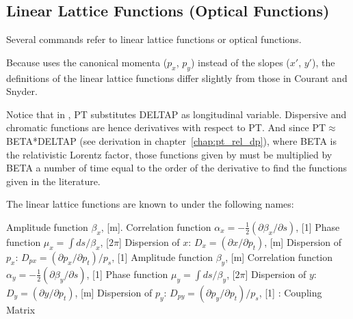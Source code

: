 \subsection{Linear Lattice Functions (Optical Functions)}
\label{subsec:tables-linear}
Several \madx commands refer to linear lattice functions or optical
functions.  

Because \madx uses the canonical momenta ($p_x$, $p_y$) instead of the
slopes ($x'$, $y'$), the definitions of the linear lattice functions
differ slightly from those in Courant and Snyder\cite{Courant-Snyder1958}.

Notice that in \madx, PT substitutes DELTAP as longitudinal
variable. 
Dispersive and chromatic functions are hence derivatives with
respect to PT. 
And since PT$\approx$BETA*DELTAP (see derivation in chapter~\ref{chap:pt_rel_dp}), 
where BETA is the relativistic Lorentz 
factor, those functions given by \madx must be multiplied by BETA a
number of time equal to the order of the derivative to find the
functions given in the literature. 

The linear lattice functions are known to \madx under the following names:
\begin{madlist}
   Amplitude function $\beta_x$, [m].   
   Correlation function 
  $\alpha_x = - \frac{1}{2} (\partial \beta_x / \partial s)$, [1]   
   Phase function $\mu_x = \int ds / \beta_x$, [$2 \pi$]
   Dispersion of $x$: $D_x = (\partial x / \partial p_t)$, [m] 
   Dispersion of $p_x$: $D_{px} = (\partial p_x / \partial p_t) / p_s$, [1] 
   Amplitude function $\beta_y$, [m]   
   Correlation function 
  $\alpha_y = - \frac{1}{2} ( \partial \beta_y / \partial s)$, [1] 
   Phase function $\mu_y = \int ds / \beta_y$, [$2 \pi$]
   Dispersion of $y$: $D_y = (\partial y / \partial p_t)$, [m] 
   Dispersion of $p_y$: $D_{py} = ( \partial p_y / \partial p_t) / p_s$, [1] 
   : Coupling Matrix     
\end{madlist}



